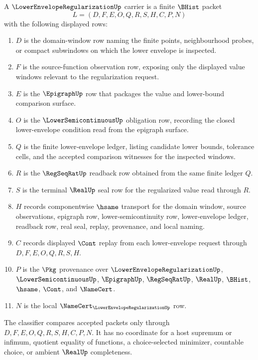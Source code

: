 \begin{definition}
\label{def:lower-envelope-regularization-carrier}
A $\LowerEnvelopeRegularizationUp$ carrier is a finite $\BHist$ packet
$$
L=(D,F,E,O,Q,R,S,H,C,P,N)
$$
with the following displayed rows:
\begin{enumerate}
\item $D$ is the domain-window row naming the finite points, neighbourhood probes, or compact subwindows on which the lower envelope is inspected.
\item $F$ is the source-function observation row, exposing only the displayed value windows relevant to the regularization request.
\item $E$ is the $\EpigraphUp$ row that packages the value and lower-bound comparison surface.
\item $O$ is the $\LowerSemicontinuousUp$ obligation row, recording the closed lower-envelope condition read from the epigraph surface.
\item $Q$ is the finite lower-envelope ledger, listing candidate lower bounds, tolerance cells, and the accepted comparison witnesses for the inspected windows.
\item $R$ is the $\RegSeqRatUp$ readback row obtained from the same finite ledger $Q$.
\item $S$ is the terminal $\RealUp$ seal row for the regularized value read through $R$.
\item $H$ records componentwise $\hsame$ transport for the domain window, source observations, epigraph row, lower-semicontinuity row, lower-envelope ledger, readback row, real seal, replay, provenance, and local naming.
\item $C$ records displayed $\Cont$ replay from each lower-envelope request through $D,F,E,O,Q,R,S,H$.
\item $P$ is the $\Pkg$ provenance over $\LowerEnvelopeRegularizationUp$, $\LowerSemicontinuousUp$, $\EpigraphUp$, $\RegSeqRatUp$, $\RealUp$, $\BHist$, $\hsame$, $\Cont$, and $\NameCert$.
\item $N$ is the local $\NameCert_{\LowerEnvelopeRegularizationUp}$ row.
\end{enumerate}
The classifier compares accepted packets only through $D,F,E,O,Q,R,S,H,C,P,N$. It has no coordinate for a host supremum or infimum, quotient equality of functions, a choice-selected minimizer, countable choice, or ambient $\RealUp$ completeness.
\end{definition}

